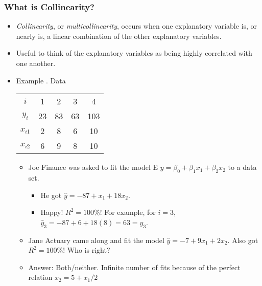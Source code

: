 \begin{frame}[shrink=2]
 \frametitle{What is Collinearity?}
 \begin{itemize}
  \item \textit{Collinearity}, or \textit{multicollinearity}, occurs when
one explanatory variable is, or nearly is, a linear combination of
the other explanatory variables.
  \item Useful to think
of the explanatory variables as being highly correlated with one
another.
   \item Example . Data
\begin{center}
\begin{tabular}{ccccc}
\hline
$i$ & 1 & 2 & 3 & 4 \\
$y_{i}$ & 23 & 83 & 63 & 103 \\
$x_{i1}$ & 2 & 8 & 6 & 10 \\
$x_{i2}$ & 6 & 9 & 8 & 10 \\ \hline
\end{tabular}%
\end{center}
 \begin{itemize}[<+->]
\item Joe Finance was asked to fit the model E
$y=\beta _{0}+\beta _{1}x_{1}+\beta _{2}x_{2}$ to a data set.
\begin{itemize}
  \item  He got $\hat{y}=-87+x_{1}+18x_{2}.$
\item Happy! $R^2 = 100\% !$ For example, for $i=3$,
$\hat{y}_{3}=-87+6+18(8)=63 = y_{3}$.
   \end{itemize}
\item  Jane Actuary came along and fit the model
$\hat{y}=-7+9x_{1}+2x_{2}.$ Also got $R^2 = 100\% !$ Who is right?
\item Answer: Both/neither. Infinite number of fits because of the
perfect relation $x_{2}=5+x_{1}/2$
    \end{itemize}    \end{itemize}
\end{frame}


